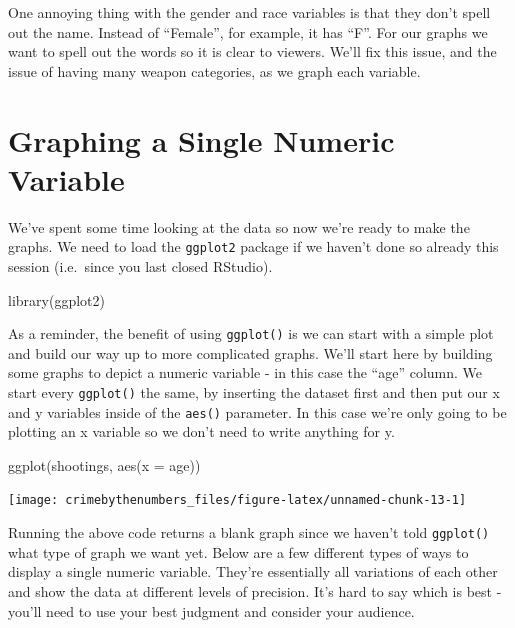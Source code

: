 \documentclass[
]{krantz}
\makeatletter
\newenvironment{Shaded}{\begin{snugshade}}{\end{snugshade}}
\newcommand{\AttributeTok}[1]{\textcolor[rgb]{0.61,0.61,0.61}{#1}}
\newcommand{\FunctionTok}[1]{\textcolor[rgb]{0,0,0}{#1}}
\newcommand{\NormalTok}[1]{#1}
\newenvironment{kframe}{%
\medskip{}
\setlength{\fboxsep}{.8em}
 \def\at@end@of@kframe{}%
 \ifinner\ifhmode%
  \def\at@end@of@kframe{\end{minipage}}%
  \begin{minipage}{\columnwidth}%
 \fi\fi%
 \def\FrameCommand##1{\hskip\@totalleftmargin \hskip-\fboxsep
 \colorbox{shadecolor}{##1}\hskip-\fboxsep
     \hskip-\linewidth \hskip-\@totalleftmargin \hskip\columnwidth}%
 \MakeFramed {\advance\hsize-\width
   \@totalleftmargin\z@ \linewidth\hsize
   \@setminipage}}%
 {\par\unskip\endMakeFramed%
 \at@end@of@kframe}
\renewenvironment{Shaded}{\begin{kframe}}{\end{kframe}}
\makeatother
\begin{document}
One annoying thing with the gender and race variables is that they don't spell out the name. Instead of ``Female'', for example, it has ``F''. For our graphs we want to spell out the words so it is clear to viewers. We'll fix this issue, and the issue of having many weapon categories, as we graph each variable.

\hypertarget{graphing-a-single-numeric-variable}{%
\section{Graphing a Single Numeric Variable}\label{graphing-a-single-numeric-variable}}

We've spent some time looking at the data so now we're ready to make the graphs. We need to load the \texttt{ggplot2} package if we haven't done so already this session (i.e.~since you last closed RStudio).

\begin{Shaded}
\begin{Highlighting}[]
\FunctionTok{library}\NormalTok{(ggplot2)}
\end{Highlighting}
\end{Shaded}

As a reminder, the benefit of using \texttt{ggplot()} is we can start with a simple plot and build our way up to more complicated graphs. We'll start here by building some graphs to depict a numeric variable - in this case the ``age'' column. We start every \texttt{ggplot()} the same, by inserting the dataset first and then put our x and y variables inside of the \texttt{aes()} parameter. In this case we're only going to be plotting an x variable so we don't need to write anything for y.

\begin{Shaded}
\begin{Highlighting}[]
\FunctionTok{ggplot}\NormalTok{(shootings, }\FunctionTok{aes}\NormalTok{(}\AttributeTok{x =}\NormalTok{ age))}
\end{Highlighting}
\end{Shaded}

\begin{center}\texttt{[image: crimebythenumbers\_files/figure-latex/unnamed-chunk-13-1]} \end{center}

Running the above code returns a blank graph since we haven't told \texttt{ggplot()} what type of graph we want yet. Below are a few different types of ways to display a single numeric variable. They're essentially all variations of each other and show the data at different levels of precision. It's hard to say which is best - you'll need to use your best judgment and consider your audience.
\end{document}
